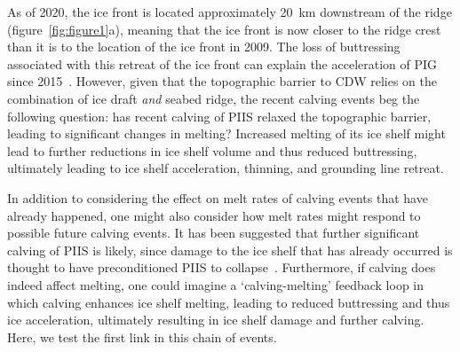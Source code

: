 \documentclass[draft]{agujournal2019}
\begin{document}
As of 2020, the ice front is located approximately 20~km downstream of the ridge (figure~\ref{fig:figure1}a), meaning that the ice front is now closer to the ridge crest than it is to the location of the ice front in 2009. The loss of buttressing associated with this retreat of the ice front can explain the acceleration of PIG since 2015~\cite{Joughin2021ScienceAdv}. However, given that the topographic barrier to CDW relies on the combination of ice draft \textit{and} seabed ridge, the recent calving events beg the following question: has recent calving of PIIS relaxed the topographic barrier, leading to significant changes in melting? Increased melting of its ice shelf might lead to further reductions in ice shelf volume and thus reduced buttressing, ultimately leading to ice shelf acceleration, thinning, and grounding line retreat.

In addition to considering the effect on melt rates of calving events that have already happened, one might also consider how melt rates might respond to possible future calving events. It has been suggested that further significant calving of PIIS is likely, since damage to the ice shelf that has already occurred is thought to have preconditioned PIIS to collapse~\cite{Lhermitte2020PNAS}. Furthermore, if calving does indeed affect melting, one could imagine a `calving-melting' feedback loop in which calving enhances ice shelf melting, leading to reduced buttressing and thus ice acceleration, ultimately resulting in ice shelf damage and further calving. Here, we test the first link in this chain of events.
\end{document}
